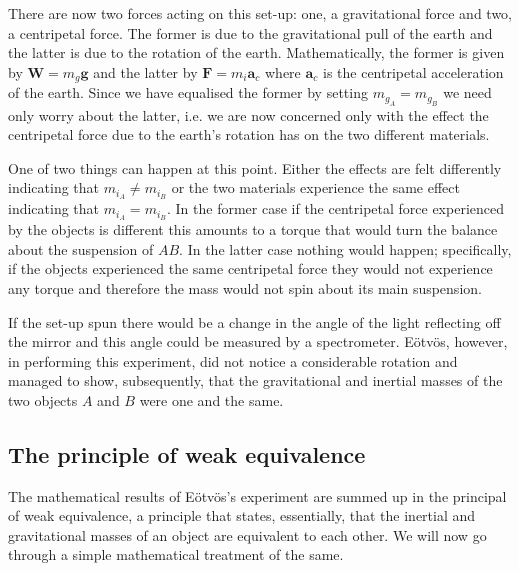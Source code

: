 \documentclass[english,seminar]{lecture}
\begin{document}
There are now two forces acting on this set-up: one, a gravitational force and two, a centripetal force. The former is due to the gravitational pull of the earth and the latter is due to the rotation of the earth. Mathematically, the former is given by $\mathbf{W} = m_g \mathbf{g}$ and the latter by $\mathbf{F} = m_i \mathbf{a}_c$ where $\mathbf{a}_c$ is the centripetal acceleration of the earth. Since we have equalised the former by setting $m_{g_A} = m_{g_B}$ we need only worry about the latter, i.e. we are now concerned only with the effect the centripetal force due to the earth's rotation has on the two different materials.

One of two things can happen at this point. Either the effects are felt differently indicating that $m_{i_A} \neq m_{i_B}$ or the two materials experience the same effect indicating that $m_{i_A} = m_{i_B}$. In the former case if the centripetal force experienced by the objects is different this amounts to a torque that would turn the balance about the suspension of $AB$. In the latter case nothing would happen; specifically, if the objects experienced the same centripetal force they would not experience any torque and therefore the mass would not spin about its main suspension.

If the set-up spun there would be a change in the angle of the light reflecting off the mirror and this angle could be measured by a spectrometer. E\"{o}tv\"{o}s, however, in performing this experiment, did not notice a considerable rotation and managed to show, subsequently, that the gravitational and inertial masses of the two objects $A$ and $B$ were one and the same.

\subsection{The principle of weak equivalence}

The mathematical results of E\"{o}tv\"{o}s's experiment are summed up in the principal of weak equivalence, a principle that states, essentially, that the inertial and gravitational masses of an object are equivalent to each other. We will now go through a simple mathematical treatment of the same.
\end{document}
